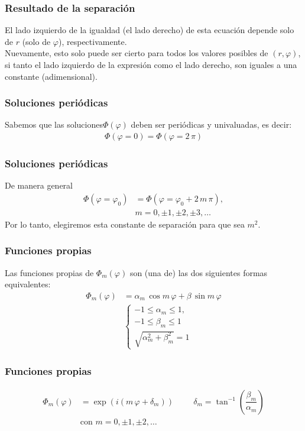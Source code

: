 \begin{frame}
\frametitle{Resultado de la separación}
El lado izquierdo de la igualdad (el lado derecho) de esta ecuación depende solo de $r$ (solo de $\varphi$), respectivamente.
\\
\bigskip
\pause
Nuevamente, esto solo puede ser cierto para todos los valores posibles de $(r, \varphi)$, si tanto el lado izquierdo de la expresión como el lado derecho, son iguales a una constante (adimensional).
\end{frame}
\begin{frame}
\frametitle{Soluciones periódicas}
Sabemos que las soluciones$\Phi(\varphi)$ deben ser periódicas y univaluadas, es decir:
\begin{align*}
\Phi (\varphi = 0) = \Phi (\varphi = 2 \, \pi)
\end{align*}
\end{frame}
\begin{frame}
\frametitle{Soluciones periódicas}
De manera general
\begin{align*}
\Phi (\varphi = \varphi_{0}) &= \Phi (\varphi = \varphi_{0} + 2 \, m \, \pi), \\[0.em]
&m = 0, \pm 1, \pm 2,\pm 3, \ldots
\end{align*}
\pause
Por lo tanto, elegiremos esta constante de separación para que sea $m^{2}$.
\end{frame}
\begin{frame}
\frametitle{Funciones propias}
Las funciones propias de $\Phi_{m} (\varphi)$ son (una de) las dos siguientes formas equivalentes:
\begin{align*}
\Phi_{m} (\varphi) &= \alpha_{m} \, \cos m \, \varphi + \beta \, \sin m \, \varphi \\[1em]
&\begin{cases}
-1 \leq \alpha_{m} \leq 1, \\
-1 \leq \beta_{m} \leq 1 \\
\sqrt{\alpha_{m}^{2} + \beta_{m}^{2}} = 1
\end{cases}
\end{align*}
\end{frame}
\begin{frame}
\frametitle{Funciones propias}
\begin{align*}
\Phi_{m} (\varphi) &= \exp(i (m \, \varphi + \delta_{m})) \hspace{1cm} \delta_{m} = \tan^{-1} \left( \dfrac{\beta_{m}}{\alpha_{m}}\right) \\[1em]
&\mbox{con } m = 0, \pm 1, \pm 2, \ldots
\end{align*}
\end{frame}
